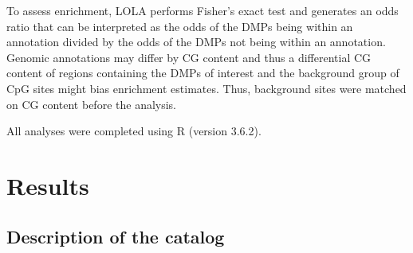 \documentclass[11pt,oneside]{bristolthesis}
\begin{document}
To assess enrichment, LOLA performs Fisher's exact test and generates an odds ratio that can be interpreted as the odds of the DMPs being within an annotation divided by the odds of the DMPs not being within an annotation. Genomic annotations may differ by CG content and thus a differential CG content of regions containing the DMPs of interest and the background group of CpG sites might bias enrichment estimates. Thus, background sites were matched on CG content before the analysis.

All analyses were completed using R (version 3.6.2).

\newpage

\hypertarget{results-04}{%
\section{Results}\label{results-04}}

\hypertarget{catalog-description}{%
\subsection*{Description of the catalog}\label{catalog-description}}
\end{document}

